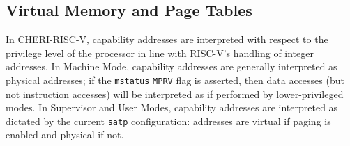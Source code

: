 %
%
%

\subsection{Virtual Memory and Page Tables}
\label{subsection:riscv:pagetables}

In CHERI-RISC-V, capability addresses are interpreted with respect to the
privilege level of the processor in line with RISC-V's handling of integer
addresses.
%
In Machine Mode, capability addresses are generally interpreted as physical
addresses; if the \texttt{mstatus} \texttt{MPRV} flag is asserted, then data
accesses (but not instruction accesses) will be interpreted as if performed by
lower-privileged modes.
%
In Supervisor and User Modes, capability addresses are interpreted as dictated
by the current \texttt{satp} configuration: addresses are virtual if paging is
enabled and physical if not.
%

